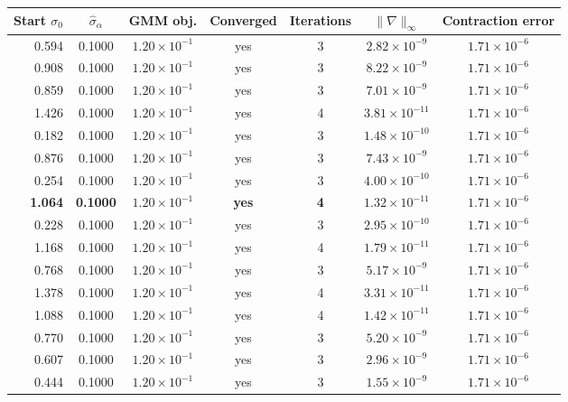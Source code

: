 \begin{tabular}{rcccccc}
\toprule
Start $\sigma_0$ & $\hat\sigma_\alpha$ & GMM obj. & Converged & Iterations & $\|\nabla\|_\infty$ & Contraction error \\
\midrule
0.594 & 0.1000 & $1.20\times10^{-1}$ & yes & 3 & $2.82\times10^{-9}$ & $1.71\times10^{-6}$ \\
0.908 & 0.1000 & $1.20\times10^{-1}$ & yes & 3 & $8.22\times10^{-9}$ & $1.71\times10^{-6}$ \\
0.859 & 0.1000 & $1.20\times10^{-1}$ & yes & 3 & $7.01\times10^{-9}$ & $1.71\times10^{-6}$ \\
1.426 & 0.1000 & $1.20\times10^{-1}$ & yes & 4 & $3.81\times10^{-11}$ & $1.71\times10^{-6}$ \\
0.182 & 0.1000 & $1.20\times10^{-1}$ & yes & 3 & $1.48\times10^{-10}$ & $1.71\times10^{-6}$ \\
0.876 & 0.1000 & $1.20\times10^{-1}$ & yes & 3 & $7.43\times10^{-9}$ & $1.71\times10^{-6}$ \\
0.254 & 0.1000 & $1.20\times10^{-1}$ & yes & 3 & $4.00\times10^{-10}$ & $1.71\times10^{-6}$ \\
\textbf{1.064} & \textbf{0.1000} & \textbf{$1.20\times10^{-1}$} & \textbf{yes} & \textbf{4} & \textbf{$1.32\times10^{-11}$} & \textbf{$1.71\times10^{-6}$} \\
0.228 & 0.1000 & $1.20\times10^{-1}$ & yes & 3 & $2.95\times10^{-10}$ & $1.71\times10^{-6}$ \\
1.168 & 0.1000 & $1.20\times10^{-1}$ & yes & 4 & $1.79\times10^{-11}$ & $1.71\times10^{-6}$ \\
0.768 & 0.1000 & $1.20\times10^{-1}$ & yes & 3 & $5.17\times10^{-9}$ & $1.71\times10^{-6}$ \\
1.378 & 0.1000 & $1.20\times10^{-1}$ & yes & 4 & $3.31\times10^{-11}$ & $1.71\times10^{-6}$ \\
1.088 & 0.1000 & $1.20\times10^{-1}$ & yes & 4 & $1.42\times10^{-11}$ & $1.71\times10^{-6}$ \\
0.770 & 0.1000 & $1.20\times10^{-1}$ & yes & 3 & $5.20\times10^{-9}$ & $1.71\times10^{-6}$ \\
0.607 & 0.1000 & $1.20\times10^{-1}$ & yes & 3 & $2.96\times10^{-9}$ & $1.71\times10^{-6}$ \\
0.444 & 0.1000 & $1.20\times10^{-1}$ & yes & 3 & $1.55\times10^{-9}$ & $1.71\times10^{-6}$ \\
\bottomrule
\end{tabular}
